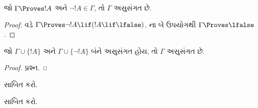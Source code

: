\documentclass[../../../include/open-logic-section]{subfiles}
\begin{document}
\begin{prop}
  જો $\Gamma \Proves !A$ અને $\lnot !A \in \Gamma$, તો $\Gamma$
  અસુસંગત છે.
\end{prop}

\begin{proof}
   વડે
  $\Gamma \Proves \lnot !A \lif (!A \lif \lfalse)$.
  ના બે ઉપયોગથી $\Gamma \Proves \lfalse$.
\end{proof}


\begin{prop}
  જો $\Gamma \cup \{!A\}$ અને $\Gamma \cup \{\lnot !A\}$ બંને
  અસુસંગત હોય, તો $\Gamma$ અસુસંગત છે.
\end{prop}

\begin{proof}
પ્રશ્ન.
\end{proof}

\begin{prob}
   સાબિત કરો.
\end{prob}
\tagendprob

\begin{prob}
   સાબિત કરો.
\end{prob}
\tagendprob
\end{document}
